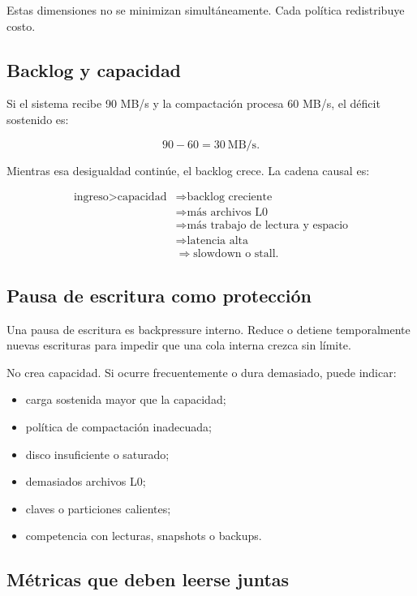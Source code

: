 \documentclass[variant=apuntes,cover=institutional,mode=screen]{ua-engineering-v6-article}
\begin{document}
Estas dimensiones no se minimizan simultáneamente. Cada política redistribuye costo.

\subsection{Backlog y capacidad}

Si el sistema recibe 90 MB/s y la compactación procesa 60 MB/s, el déficit sostenido es:

\[
90 - 60 = 30\ \text{MB/s}.
\]

Mientras esa desigualdad continúe, el backlog crece. La cadena causal es:

\[
\begin{aligned}
\text{ingreso} > \text{capacidad}
&\Rightarrow \text{backlog creciente} \\
&\Rightarrow \text{más archivos L0} \\
&\Rightarrow \text{más trabajo de lectura y espacio} \\
&\Rightarrow \text{latencia alta} \\
&\Rightarrow \text{slowdown o stall}.
\end{aligned}
\]

\subsection{Pausa de escritura como protección}

Una pausa de escritura es backpressure interno. Reduce o detiene temporalmente nuevas escrituras para impedir que una cola interna crezca sin límite.

No crea capacidad. Si ocurre frecuentemente o dura demasiado, puede indicar:

\begin{itemize}
\item carga sostenida mayor que la capacidad;
\item política de compactación inadecuada;
\item disco insuficiente o saturado;
\item demasiados archivos L0;
\item claves o particiones calientes;
\item competencia con lecturas, snapshots o backups.
\end{itemize}

\subsection{Métricas que deben leerse juntas}
\end{document}
